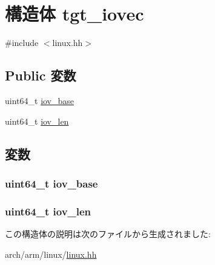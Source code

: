 \hypertarget{structArmLinux64_1_1tgt__iovec}{
\section{構造体 tgt\_\-iovec}
\label{structArmLinux64_1_1tgt__iovec}
}


{\ttfamily \#include $<$linux.hh$>$}\subsection*{Public 変数}
\begin{DoxyCompactItemize}
\item 
uint64\_\-t \hyperlink{structArmLinux64_1_1tgt__iovec_ac59b8387398fca5cb863b59eb13a8363}{iov\_\-base}
\item 
uint64\_\-t \hyperlink{structArmLinux64_1_1tgt__iovec_a530d392bf52a29de04bb57ffd97bef5d}{iov\_\-len}
\end{DoxyCompactItemize}


\subsection{変数}
\hypertarget{structArmLinux64_1_1tgt__iovec_ac59b8387398fca5cb863b59eb13a8363}{
\subsubsection[{iov\_\-base}]{\setlength{\rightskip}{0pt plus 5cm}uint64\_\-t {\bf iov\_\-base}}}
\label{structArmLinux64_1_1tgt__iovec_ac59b8387398fca5cb863b59eb13a8363}
\hypertarget{structArmLinux64_1_1tgt__iovec_a530d392bf52a29de04bb57ffd97bef5d}{
\subsubsection[{iov\_\-len}]{\setlength{\rightskip}{0pt plus 5cm}uint64\_\-t {\bf iov\_\-len}}}
\label{structArmLinux64_1_1tgt__iovec_a530d392bf52a29de04bb57ffd97bef5d}


この構造体の説明は次のファイルから生成されました:\begin{DoxyCompactItemize}
\item 
arch/arm/linux/\hyperlink{arch_2arm_2linux_2linux_8hh}{linux.hh}\end{DoxyCompactItemize}
